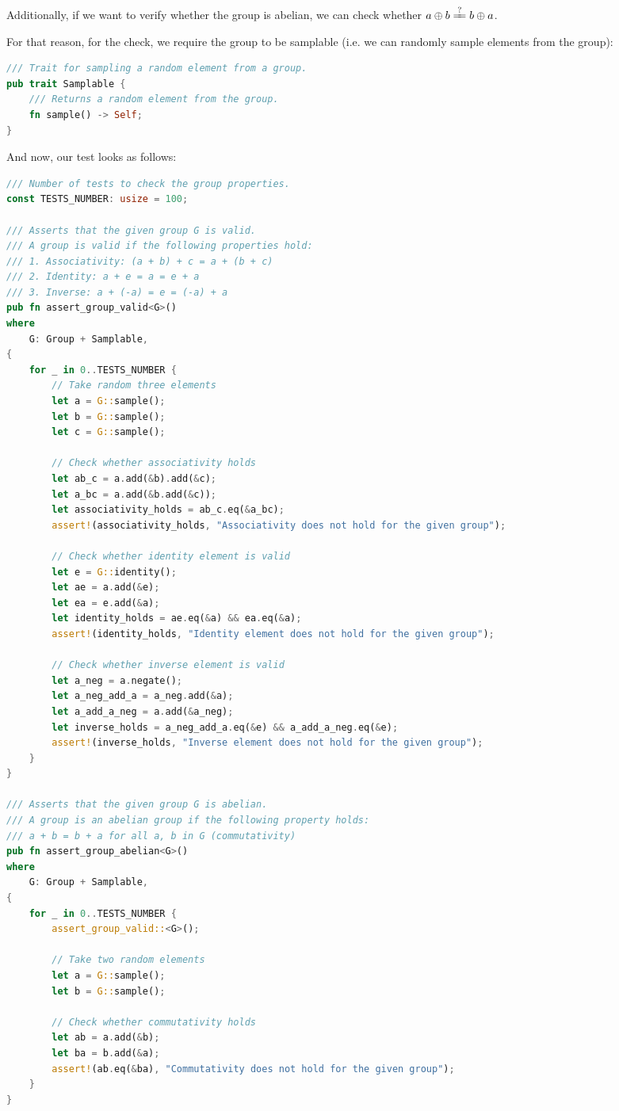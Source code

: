 \documentclass[../lecture-notes.tex]{subfiles}
\begin{document}
Additionally, if we want to verify whether the group is abelian, we can check whether $a \oplus b \xlongequal{?} b \oplus a$. 

For that reason, for the check, we require the group to be samplable (i.e. we can randomly sample elements from the group):
\begin{lstlisting}[language=Rust]
/// Trait for sampling a random element from a group.
pub trait Samplable {
    /// Returns a random element from the group.
    fn sample() -> Self;
}
\end{lstlisting}

And now, our test looks as follows:
\begin{lstlisting}[language=Rust]
/// Number of tests to check the group properties.
const TESTS_NUMBER: usize = 100;

/// Asserts that the given group G is valid.
/// A group is valid if the following properties hold:
/// 1. Associativity: (a + b) + c = a + (b + c)
/// 2. Identity: a + e = a = e + a
/// 3. Inverse: a + (-a) = e = (-a) + a
pub fn assert_group_valid<G>()
where
    G: Group + Samplable,
{
    for _ in 0..TESTS_NUMBER {
        // Take random three elements
        let a = G::sample();
        let b = G::sample();
        let c = G::sample();

        // Check whether associativity holds
        let ab_c = a.add(&b).add(&c);
        let a_bc = a.add(&b.add(&c));
        let associativity_holds = ab_c.eq(&a_bc);
        assert!(associativity_holds, "Associativity does not hold for the given group");

        // Check whether identity element is valid
        let e = G::identity();
        let ae = a.add(&e);
        let ea = e.add(&a);
        let identity_holds = ae.eq(&a) && ea.eq(&a);
        assert!(identity_holds, "Identity element does not hold for the given group");

        // Check whether inverse element is valid
        let a_neg = a.negate();
        let a_neg_add_a = a_neg.add(&a);
        let a_add_a_neg = a.add(&a_neg);
        let inverse_holds = a_neg_add_a.eq(&e) && a_add_a_neg.eq(&e);
        assert!(inverse_holds, "Inverse element does not hold for the given group");
    }
}

/// Asserts that the given group G is abelian.
/// A group is an abelian group if the following property holds:
/// a + b = b + a for all a, b in G (commutativity)
pub fn assert_group_abelian<G>()
where
    G: Group + Samplable,
{
    for _ in 0..TESTS_NUMBER {
        assert_group_valid::<G>();

        // Take two random elements
        let a = G::sample();
        let b = G::sample();

        // Check whether commutativity holds
        let ab = a.add(&b);
        let ba = b.add(&a);
        assert!(ab.eq(&ba), "Commutativity does not hold for the given group");
    }
}    
\end{lstlisting}
\end{document}
